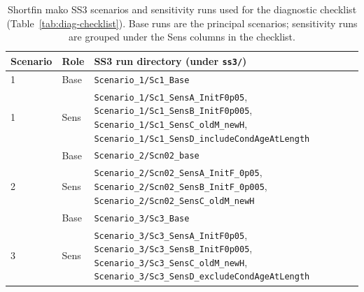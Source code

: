 
\begin{table}[H]
\centering
\small
\caption{Shortfin mako SS3 scenarios and sensitivity runs used for the diagnostic checklist (Table~\ref{tab:diag-checklist}). Base runs are the principal scenarios; sensitivity runs are grouped under the Sens columns in the checklist.}
\label{tab:sma-scenario-runs}
\begin{tabular}{llp{7.5cm}}
\toprule
Scenario & Role & SS3 run directory (under \texttt{ss3/}) \\
\midrule
1 & Base & \texttt{Scenario\_1/Sc1\_Base} \\
1 & Sens & \texttt{Scenario\_1/Sc1\_SensA\_InitF0p05}, \texttt{Scenario\_1/Sc1\_SensB\_InitF0p005}, \texttt{Scenario\_1/Sc1\_SensC\_oldM\_newH}, \texttt{Scenario\_1/Sc1\_SensD\_includeCondAgeAtLength} \\
\addlinespace
2 & Base & \texttt{Scenario\_2/Scn02\_base} \\
2 & Sens & \texttt{Scenario\_2/Scn02\_SensA\_InitF\_0p05}, \texttt{Scenario\_2/Scn02\_SensB\_InitF\_0p005}, \texttt{Scenario\_2/Scn02\_SensC\_oldM\_newH} \\
\addlinespace
3 & Base & \texttt{Scenario\_3/Sc3\_Base} \\
3 & Sens & \texttt{Scenario\_3/Sc3\_SensA\_InitF0p05}, \texttt{Scenario\_3/Sc3\_SensB\_InitF0p005}, \texttt{Scenario\_3/Sc3\_SensC\_oldM\_newH}, \texttt{Scenario\_3/Sc3\_SensD\_excludeCondAgeAtLength} \\
\bottomrule
\end{tabular}
\end{table}
